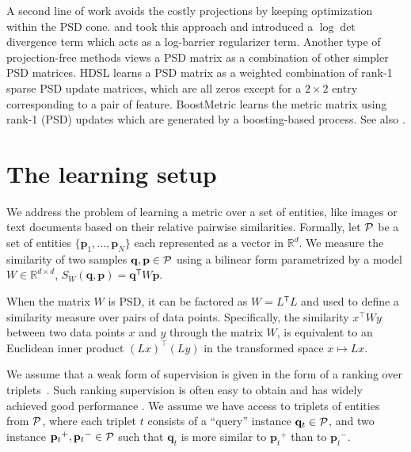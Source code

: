 \documentclass[twoside,11pt]{article}
\newcommand\mat[1]{{#1}}
\renewcommand\vec[1]{\mathbf{#1}}
\newcommand{\T}{{}^\mathsf{T}}
\newcommand{\W}{\mat{W}}
\newcommand{\Rd}{\mathbb{R}^d}
\newcommand{\ignore}[1]{}
\newcommand{\q}{{\vec{q}}}
\newcommand{\p}{{\vec{p}}}
\newcommand{\trip}{{t}}
\newcommand{\qt}{{\q_{\trip}}}
\newcommand{\pt}{{\p_{\trip}}}
\newcommand{\cholL}{\mat{L}}
\begin{document}
A second line of work avoids the costly projections by keeping optimization within the PSD cone. \citet{davis2007information} and \citet{lego} took this approach and introduced a $\log \det$ divergence term which acts as a log-barrier regularizer term. Another type of projection-free methods views a PSD matrix as a combination of other simpler PSD matrices. HDSL \citep{HDSL} learns a PSD matrix as a weighted combination of rank-1 sparse PSD update matrices, which are all zeros except for a $2\times2$ entry corresponding to a pair of feature. BoostMetric \citep{boost} learns the metric matrix using rank-1 (PSD) updates which are generated by a boosting-based process. See also \citet{bi2011adaboost, liu2012robust}.

\ignore{
We take here an approach based on minimizing a strongly convex function using block-coordinate descent. There is a well established body of work analyzing the convergence of block-coordinate descent, e.g. \citep{nesterov2012efficiency,richtarik2014iteration}. We discuss this further in Section 5 below.
}

\section{The learning setup}
We address the problem of learning a metric over a set of
entities, like images or text documents based on their
relative pairwise similarities. Formally, let $\cal{P}$ be a set of entities $\{\p_1,...,\p_N\}$ each represented as a vector in $\Rd$. We measure the similarity of two samples $\q, \p \in \cal{P}$ using a bilinear form parametrized by a model $\W \in \mathbb{R}^{d \times d}$, $S_{\W}(\q, \p) = \q\T \W \p$.

When the matrix $\W$ is PSD, it can be factored as $\W = \cholL\T \cholL$ and used to define a similarity measure over pairs of data points. Specifically, the similarity $x^\top\W y$ between two data points $x$ and $y$ through the matrix $\W$, is equivalent to an Euclidean inner product  $(\cholL x)^\top(\cholL y)$ in the transformed space $x \mapsto \cholL x$. 

We assume that a weak form of supervision is given in the form of a ranking over triplets~\citep{weinberger2006dml,OASIS,qian}. Such ranking supervision is often easy to obtain and has widely achieved good performance . We assume we have access to triplets of entities from $\cal{P}$, where each triplet $t$ consists of
a ``query'' instance $\qt \in \cal{P}$, and two instance $\pt^{+}, \pt^{-} \in \cal{P}$ such that $\qt$ is more similar to $\pt^{+}$
than to $\pt^{-}$.
\end{document}
